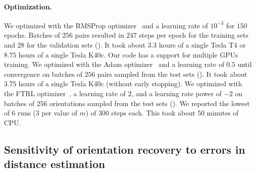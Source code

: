 \paragraph{Optimization.}
We optimized  with the RMSProp optimizer~\cite{tieleman2012rmsprop} and a learning rate of $10^{-3}$ for $150$ epochs.
Batches of $256$ pairs resulted in $247$ steps per epoch for the training sets and $28$ for the validation sets ().
It took about $3.3$ hours of a single Tesla T4 or $8.75$ hours of a single Tesla K40c. 
Our code has a support for multiple GPUs training.
We optimized  with the Adam optimizer~\cite{kingma2014adam} and a learning rate of $0.5$ until convergence on batches of $256$ pairs sampled from the test sets ().
It took about $3.75$ hours of a single Tesla K40c (without early stopping).
We optimized  with the FTRL optimizer~\cite{mcmahan2013ftrl}, a learning rate of $2$, and a learning rate power of $-2$ on batches of $256$ orientations sampled from the test sets ().
We reported the lowest of 6 runs (3 per value of $m$) of 300 steps each.
This took about 50 minutes of CPU.


\subsection{Sensitivity of orientation recovery to errors in distance estimation}\label{sec:results:orientation-recovery:sensitivity}



